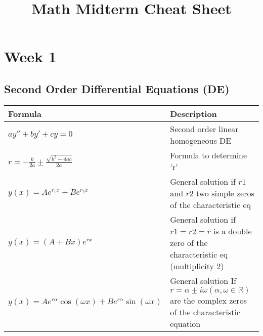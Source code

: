 \documentclass{article}
\title{Math Midterm Cheat Sheet}
\author{}
\date{}
\begin{document}
\maketitle

\section{Week 1}

\subsection{Second Order Differential Equations (DE)}

\begin{tabular}{|p{5.5cm}|p{9.5cm}|}
\hline
Formula & Description \\
\hline
$ay'' + by' + cy = 0$ & Second order linear homogeneous DE \\
\hline
$r = -\frac{b}{2a} \pm \frac{\sqrt{b^2 - 4ac}}{2a}$ & Formula to determine 'r' \\
\hline
$y(x) = Ae^{r_1x} + Be^{r_2x}$ & General solution if $r1$ and $r2$ two simple zeros of the characteristic eq\\
\hline
$y(x) = (A + Bx)e^{rx}$ & General solution if $r1 = r2 = r$ is a double zero of the characteristic eq (multiplicity 2)\\   
\hline
$y(x) = Ae^{r\alpha}\cos(\omega x) + Be^{r\alpha}\sin(\omega x)$ & General solution If $r = \alpha \pm i\omega (\alpha, \omega \in \mathbb{R})$ are the complex
zeros of the characteristic equation\\
\hline
\end{tabular}
\end{document}

